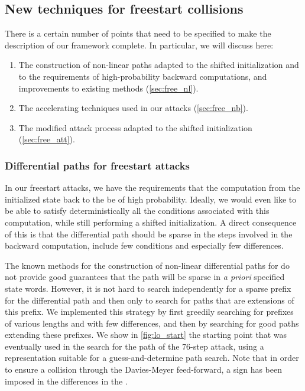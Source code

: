 \subsection{New techniques for freestart collisions}
\label{sec:attack_techs}

There is a certain number of points that need to be specified to make the description of our framework complete. In particular, we will discuss here:
\begin{enumerate}
\item The construction of non-linear paths adapted to the shifted initialization and to the requirements of high-probability backward computations, and improvements to existing
methods (\autoref{sec:free_nl}).
\item The accelerating techniques used in our attacks (\autoref{sec:free_nb}).
\item The modified attack process adapted to the shifted initialization (\autoref{sec:free_att}).
\end{enumerate}

\subsubsection{Differential paths for freestart attacks}
\label{sec:free_nl}

In our freestart attacks, we have the requirements that the computation from the initialized state back to the \iv be of high probability. Ideally, we would even like to be able to satisfy deterministically
all the conditions associated with this computation, while still performing a shifted initialization. A direct consequence of this is that the differential path should be sparse
in the steps involved in the backward computation, \ie include few conditions and especially few differences.

The known methods for the construction of non-linear differential paths for \sha do not provide good guarantees that the path will be sparse in \emph{a priori} specified state words. However, it is
not hard to search independently for a sparse prefix for the differential path and then only to search for paths that are extensions of this prefix.
We implemented this strategy by first greedily searching for prefixes of various lengths and with few differences, and then by searching for good paths extending these prefixes.
We show in \autoref{fig:lo_start} the starting point that was eventually used in the search for the path of the 76-step attack, using a representation suitable for a guess-and-determine
path search. Note that in order to ensure a collision through the Davies-Meyer feed-forward, a sign has been imposed in the differences in the \iv.

